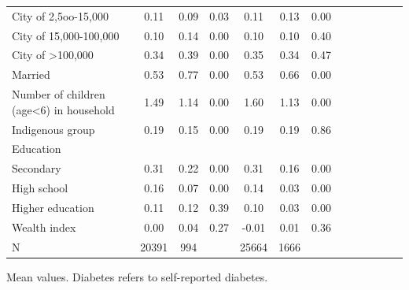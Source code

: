 \documentclass[12pt,english]{article}
\begin{document}
\begin{table}[!ht]
\begin{adjustbox}{max width=\linewidth, center}
\begin{threeparttable}
{\begin{tabular}{l*{6}{S S}}
					City of 2,5oo-15,000&        0.11&        0.09&        0.03&        0.11&        0.13&        0.00\\
					City of 15,000-100,000&        0.10&        0.14&        0.00&        0.10&        0.10&        0.40\\
					City of >100,000    &        0.34&        0.39&        0.00&        0.35&        0.34&        0.47\\
					Married             &        0.53&        0.77&        0.00&        0.53&        0.66&        0.00\\
					Number of children (age<6) in household&        1.49&        1.14&        0.00&        1.60&        1.13&        0.00\\
					Indigenous group    &        0.19&        0.15&        0.00&        0.19&        0.19&        0.86\\
					Education &&&&&& \\                    
					\hspace*{10mm}Secondary           &        0.31&        0.22&        0.00&        0.31&        0.16&        0.00\\
					\hspace*{10mm}High school         & 0.16&        0.07&        0.00&        0.14&        0.03&        0.00\\
					\hspace*{10mm}Higher education    & 0.11&        0.12&        0.39&        0.10&        0.03&        0.00\\
					Wealth index        &        0.00&        0.04&        0.27&       -0.01&        0.01&        0.36\\
					N &20391&994&&25664&1666&\\
					\bottomrule
				\end{tabular}
				\begin{tablenotes}
					\item \footnotesize  Mean values. Diabetes refers to self-reported diabetes.
				\end{tablenotes}
			}
		\end{threeparttable}
	\end{adjustbox}
\end{table}
\end{document}
